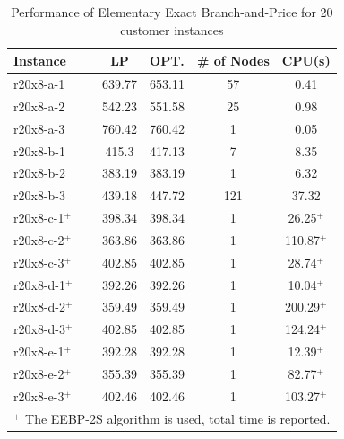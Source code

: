 \documentclass[graybox]{./styles/svmult}
\begin{document}
\begin{table}[ht]
\centering
\caption{Performance of Elementary Exact Branch-and-Price for 20 customer instances}\label{gr3-20}
\begin {tabular}[t]{|l|c|c|c|c|}  
\hline
Instance & LP & OPT. & \# of Nodes & CPU(s) \\\hline
r20x8-a-1 \ \	&	639.77	&	653.11	&	57	&	0.41	\\
r20x8-a-2 \ \	&	542.23	&	551.58	&	25	&	0.98	\\
r20x8-a-3 \ \	&	760.42	&	760.42	&	1	&	0.05	\\
r20x8-b-1 \ \	&	415.3	&	417.13	&	7	&	8.35	\\
r20x8-b-2 \ \	&	383.19	&	383.19	&	1	&	6.32	\\
r20x8-b-3 \ \	&	439.18	&	447.72	&	121	&	37.32	\\
r20x8-c-1$^+$ \ \	&	398.34	&	398.34	&	1	&	26.25$^+$	\\
r20x8-c-2$^+$ \ \	&	363.86	&	363.86	&	1	&	110.87$^+$	\\
r20x8-c-3$^+$ \ \	&	402.85	&	402.85	&	1	&	28.74$^+$	\\
r20x8-d-1$^+$ \ \	&	392.26	&	392.26	&	1	&	10.04$^+$	\\
r20x8-d-2$^+$ \ \	&	359.49	&	359.49	&	1	&	200.29$^+$	\\
r20x8-d-3$^+$ \ \	&	402.85	&	402.85	&	1	&	124.24$^+$	\\
r20x8-e-1$^+$ \ \	&	392.28	&	392.28	&	1	&	12.39$^+$	\\
r20x8-e-2$^+$ \ \	&	355.39	&	355.39	&	1	&	82.77$^+$	\\
r20x8-e-3$^+$ \ \	&	402.46	&	402.46	&	1	&	103.27$^+$	\\
\hline
\multicolumn{5}{l}{$^+$ The EEBP-2S algorithm is used, total time is reported.}\\
\end{tabular}
\end{table} 
\end{document}
